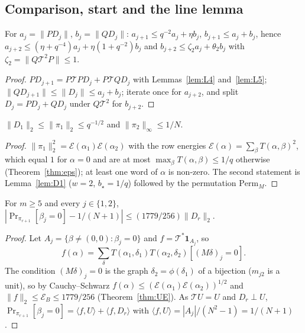 \subsection{Comparison, start and the line lemma}
\begin{lemma}[comparison]\label{lem:app-cmp}
For $a_j=\|PD_j\|$, $b_j=\|QD_j\|$: $a_{j+1}\le q^{-2}a_j+\eta b_j$, $b_{j+1}\le a_j+b_j$, hence
$a_{j+2}\le(\eta+q^{-4})a_j+\eta(1+q^{-2})b_j$ and $b_{j+2}\le\zeta_2a_j+\theta_2b_j$ with $\zeta_2=\|Q\mathcal T^2P\|\le1$.
\end{lemma}
\begin{proof}
$PD_{j+1}=P\mathcal TPD_j+P\mathcal TQD_j$ with Lemmas~\ref{lem:L4} and~\ref{lem:L5}; $\|QD_{j+1}\|\le\|D_j\|\le a_j+b_j$; iterate once for $a_{j+2}$, and split
$D_j=PD_j+QD_j$ under $Q\mathcal T^2$ for $b_{j+2}$.
\end{proof}

\begin{lemma}[start]\label{lem:app-start}
$\|D_1\|_2\le\|\pi_1\|_2\le q^{-1/2}$ and $\|\pi_2\|_\infty\le1/N$.
\end{lemma}
\begin{proof}
$\|\pi_1\|_2^2=\mathcal E(\alpha_1)\mathcal E(\alpha_2)$ with the row energies $\mathcal E(\alpha)=\sum_\beta T(\alpha,\beta)^2$, which equal $1$ for $\alpha=0$ and are at most
$\max_\beta T(\alpha,\beta)\le1/q$ otherwise (Theorem~\ref{thm:eps}); at least one word of $\alpha$ is non-zero. The second statement is Lemma~\ref{lem:D1}
($w=2$, $b_\star=1/q$) followed by the permutation $\mathrm{Perm}_M$.
\end{proof}

\begin{lemma}\label{lem:app-line}
For $m\ge5$ and every $j\in\{1,2\}$, $|\Pr_{\pi_{r+1}}[\beta_j=0]-1/(N+1)|\le(1779/256)\|D_r\|_2$.
\end{lemma}
\begin{proof}
Let $A_j=\{\beta\ne(0,0):\beta_j=0\}$ and $f=\mathcal T^*\mathbf 1_{A_j}$, so
\[f(\alpha)=\sum_\delta T(\alpha_1,\delta_1)T(\alpha_2,\delta_2)[(M\delta)_j=0].\]
The condition
$(M\delta)_j=0$ is the graph $\delta_2=\phi(\delta_1)$ of a bijection ($m_{j2}$ is a unit), so by Cauchy--Schwarz $f(\alpha)\le(\mathcal E(\alpha_1)\mathcal E(\alpha_2))^{1/2}$ and
$\|f\|_2\le\mathcal E_B\le1779/256$ (Theorem~\ref{thm:UE}). As $\mathcal TU=U$ and $D_r\perp U$,
$\Pr_{\pi_{r+1}}[\beta_j=0]=\langle f,U\rangle+\langle f,D_r\rangle$ with $\langle f,U\rangle=|A_j|/(N^2-1)=1/(N+1)$.
\end{proof}

